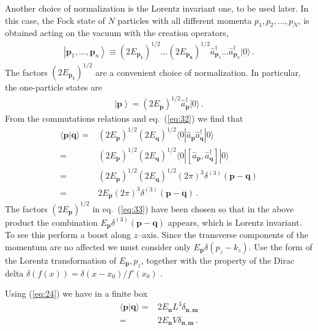 Another choice of normalization is the Lorentz invariant one, to be used later. In this case, the Fock state of $N$ particles with all different momenta $p_1,p_2,\ldots,p_N$, is obtained acting on the vacuum with the creation operators,
\begin{align}
  \left|\mathbf{p}_1,\ldots,\mathbf{p}_n\right\rangle\equiv
  \left(2E_\mathbf{p_1}\right)^{1/2}\ldots\left(2E_\mathbf{p_n}\right)^{1/2}
  \widehat{a}_{\mathbf{p}_1}^\dagger\ldots\widehat{a}_{\mathbf{p}_n}^\dagger|0\rangle\,.
\end{align}
The factors $\left(2E_\mathbf{p_1}\right)^{1/2}$ are a convenient choice of normalization. In particular,
the one-particle states are
\begin{align}
  \label{eq:33}
   \left|\mathbf{p}\right\rangle=
  \left(2E_\mathbf{p}\right)^{1/2}
  \widehat{a}_{\mathbf{p}}^\dagger|0\rangle\,.
\end{align}
From the commutations relations and eq.~(\ref{eq:32}) we find that
\begin{align}
\label{eq:34}
\langle\mathbf{p} |\mathbf{q}\rangle=&
  \left(2E_{\mathbf{p}}\right)^{1/2}\left(2E_{\mathbf{q}}\right)^{1/2}
 \langle0|\widehat{a}_{\mathbf{p}} \widehat{a}_{\mathbf{q}}^\dagger|0\rangle\nonumber\\
=&\left(2E_{\mathbf{p}}\right)^{1/2}\left(2E_{\mathbf{q}}\right)^{1/2}
 \langle0|\left[\widehat{a}_{\mathbf{p}}, 
\widehat{a}_{\mathbf{q}}^\dagger\right]|0\rangle\nonumber\\
=&\left(2E_{\mathbf{p}}\right)^{1/2}\left(2E_{\mathbf{q}}\right)^{1/2}\left({2\pi}\right)^3\delta^{(3)}(\mathbf{p}-\mathbf{q})\nonumber\\
=&2E_{\mathbf{p}}\left({2\pi}\right)^3\delta^{(3)}(\mathbf{p}-\mathbf{q})\,.
\end{align}
The factors $\left(2E_\mathbf{p}\right)^{1/2}$ in eq.~(\ref{eq:33}) have been chosen so that in the above product the combination $E_{\mathbf{p}}\delta^{(3)}(\mathbf{p}-\mathbf{q})$ appears, which is Lorentz invariant. To see this perform a boost along $z$--axis. Since the transverse components of the momentum are no affected we must consider only $E_{\mathbf{p}}\delta(p_z-k_z)$. Use the form of the Lorentz transformation of $E_{\mathbf{p}},p_z$, together with the property of the Dirac delta $\delta(f(x))=\delta(x-x_0)/f'(x_0)$ \cite{Maggiore:2005qv}.

Using (\ref{eq:24}) we have in a finite box
\begin{align}
  \label{eq:35}
   \langle\mathbf{p} |\mathbf{q}\rangle=&2E_{\mathbf{n}}L^3 
   \delta_{{\mathbf{n}},{\mathbf{m}}}\nonumber\\
=&2E_{\mathbf{n}}V
   \delta_{{\mathbf{n}},{\mathbf{m}}}\,.
\end{align}

